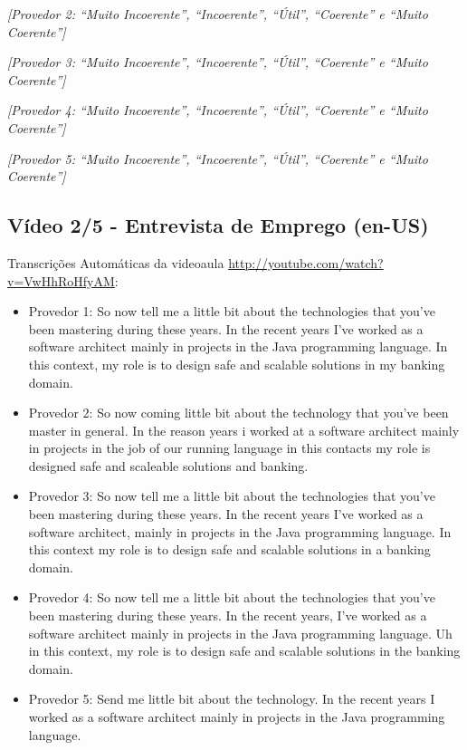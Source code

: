 \noindent
\textit{[Provedor 2: ``Muito Incoerente'', ``Incoerente'', ``Útil'', ``Coerente'' e ``Muito Coerente'']}

\noindent
\textit{[Provedor 3: ``Muito Incoerente'', ``Incoerente'', ``Útil'', ``Coerente'' e ``Muito Coerente'']}

\noindent
\textit{[Provedor 4: ``Muito Incoerente'', ``Incoerente'', ``Útil'', ``Coerente'' e ``Muito Coerente'']}

\noindent
\textit{[Provedor 5: ``Muito Incoerente'', ``Incoerente'', ``Útil'', ``Coerente'' e ``Muito Coerente'']}

\subsection{Vídeo 2/5 - Entrevista de Emprego (en-US)}

\noindent
Transcrições Automáticas da videoaula \url{http://youtube.com/watch?v=VwHhRoHfyAM}:

\begin{itemize}
    \item Provedor 1: So now tell me a little bit about the technologies that you've been mastering during these years. In the recent years I've worked as a software architect mainly in projects in the Java programming language. In this context, my role is to design safe and scalable solutions in my banking domain.
    \item Provedor 2: So now coming little bit about the technology that you've been master in general. In the reason years i worked at a software architect mainly in projects in the job of our running language in this contacts my role is designed safe and scaleable solutions and banking.
    \item Provedor 3: So now tell me a little bit about the technologies that you've been mastering during these years. In the recent years I've worked as a software architect, mainly in projects in the Java programming language. In this context my role is to design safe and scalable solutions in a banking domain.
    \item Provedor 4: So now tell me a little bit about the technologies that you've been mastering during these years. In the recent years, I've worked as a software architect mainly in projects in the Java programming language. Uh in this context, my role is to design safe and scalable solutions in the banking domain.
    \item Provedor 5: Send me little bit about the technology. In the recent years I worked as a software architect mainly in projects in the Java programming language.
\end{itemize}

